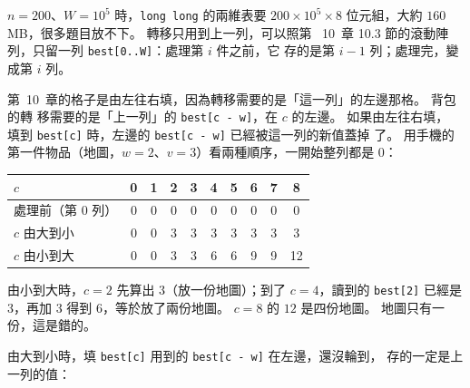 $n = 200$、$W = 10^5$ 時，\texttt{long long} 的兩維表要 $200 \times 10^5
\times 8$ 位元組，大約 $160$ MB，很多題目放不下。 轉移只用到上一列，可以照第
~10~章 10.3 節的滾動陣列，只留一列 \texttt{best[0..W]}：處理第 $i$ 件之前，它
存的是第 $i - 1$ 列；處理完，變成第 $i$ 列。

第~10~章的格子是由左往右填，因為轉移需要的是「這一列」的左邊那格。 背包的轉
移需要的是「上一列」的 \texttt{best[c - w]}，在 $c$ 的左邊。 如果由左往右填，
填到 \texttt{best[c]} 時，左邊的 \texttt{best[c - w]} 已經被這一列的新值蓋掉
了。 用手機的第一件物品（地圖，$w = 2$、$v = 3$）看兩種順序，一開始整列都是
$0$：

\begin{center}
\begin{tabular}{l|ccccccccc}
\toprule
$c$ & 0 & 1 & 2 & 3 & 4 & 5 & 6 & 7 & 8 \\
\midrule
處理前（第 $0$ 列） & 0 & 0 & 0 & 0 & 0 & 0 & 0 & 0 & 0 \\
$c$ 由大到小 & 0 & 0 & 3 & 3 & 3 & 3 & 3 & 3 & 3 \\
$c$ 由小到大 & 0 & 0 & 3 & 3 & 6 & 6 & 9 & 9 & 12 \\
\bottomrule
\end{tabular}
\end{center}

由小到大時，$c = 2$ 先算出 $3$（放一份地圖）；到了 $c = 4$，讀到的
\texttt{best[2]} 已經是 $3$，再加 $3$ 得到 $6$，等於放了兩份地圖。 $c = 8$
的 $12$ 是四份地圖。 地圖只有一份，這是錯的。

由大到小時，填 \texttt{best[c]} 用到的 \texttt{best[c - w]} 在左邊，還沒輪到，
存的一定是上一列的值：

\begin{center}
\label{fig:knap-reverse}
\end{center}

